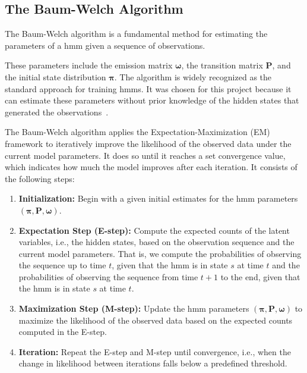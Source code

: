 

\subsection{The Baum-Welch Algorithm}\label{subsec:baum-welch}
The Baum-Welch algorithm is a fundamental method for estimating the parameters of a \gls{hmm} given a sequence of observations.

These parameters include the emission matrix $\pmb{\omega}$, the transition matrix $\pmb{P}$, and the initial state distribution $\pmb{\pi}$.
The algorithm is widely recognized as the standard approach for training \glspl{hmm}.
It was chosen for this project because it can estimate these parameters without prior knowledge of the hidden states that generated the observations~\cite{levinson1983introduction}.

The Baum-Welch algorithm applies the Expectation-Maximization (EM) framework to iteratively improve the likelihood of the observed data under the current model parameters. It does so until it reaches a set convergence value, which indicates how much the model improves after each iteration.
It consists of the following steps:

\begin{enumerate}
    \item \textbf{Initialization:} Begin with a given initial estimates for the \gls{hmm} parameters $(\pmb{\pi}, \pmb{P}, \pmb{\omega})$.
    \item \textbf{Expectation Step (E-step):} Compute the expected counts of the latent variables, i.e., the hidden states, based on the observation sequence and the current model parameters.
    That is, we compute the probabilities of observing the sequence up to time $t$, given that the \gls{hmm} is in state $s$ at time $t$ and the probabilities of observing the sequence from time $t+1$ to the end, given that the \gls{hmm} is in state $s$ at time $t$.
    \item \textbf{Maximization Step (M-step):} Update the \gls{hmm} parameters $(\pmb{\pi}, \pmb{P}, \pmb{\omega})$ to maximize the likelihood of the observed data based on the expected counts computed in the E-step.
    \item \textbf{Iteration:} Repeat the E-step and M-step until convergence, i.e., when the change in likelihood between iterations falls below a predefined threshold.
\end{enumerate}

